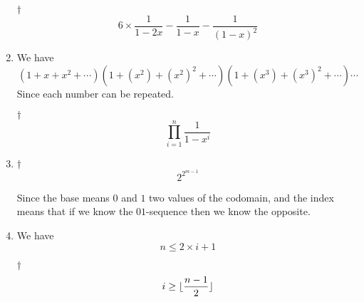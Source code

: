 \documentclass[a4paper,12pt]{article}
\begin{document}
\begin{enumerate}
	\begin{answer}{$\dag$} \begin{equation}
            6 \times \frac{1}{1 - 2x} - \frac{1}{1 - x} - \frac{1}{(1 - x)^2}
		\end{equation}
	\end{answer}
    \item We have \begin{equation}
        (1 + x + x^2 + \cdots)(1 + (x^2) + (x^2)^2 + \cdots)(1 + (x^3) + (x^3)^2 + \cdots)\cdots
    \end{equation} Since each number can be repeated.
    \begin{answer}{$\dag$}\begin{equation}
            \displaystyle\prod_{i = 1}^{n}\frac{1}{1 - x^i}            
        \end{equation} 
    \end{answer}
    \item \begin{answer}{$\dag$}\begin{equation}
            2^{2^{m - 1}}            
        \end{equation}
    \end{answer} Since the base means $0$ and $1$ two values of the codomain, and the index means that if we know the $01$-sequence then we know the opposite.
    \item We have \begin{equation}
        n \le 2 \times i + 1
    \end{equation}
    \begin{answer}{$\dag$}\begin{equation}
            i \ge \lfloor\frac{n - 1}{2}\rfloor
        \end{equation}
    \end{answer}
\end{enumerate}

\end{document}
